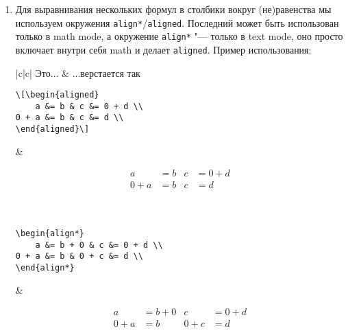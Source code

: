 \begin{enumerate}
\item
	Для выравнивания нескольких формул в столбики вокруг (не)равенства
	мы используем окружения \texttt{align*}/\texttt{aligned}.
	Последний может быть использован только в math mode, а окружение \texttt{align*}
	"--- только в text mode, оно просто включает внутри себя math и делает \texttt{aligned}.
	Пример использования:

	\begin{center}\begin{tabular}{|c|c|}
		\hline Это... & ...верстается так \\
		\hline \begin{minipage}{0.5\linewidth}
\begin{verbatim}
\[\begin{aligned}
    a &= b & c &= 0 + d \\
0 + a &= b & c &= d \\
\end{aligned}\]
\end{verbatim}
		\end{minipage}
        &
		\begin{minipage}{0.35\linewidth}
\[\begin{aligned}
    a &= b & c &= 0 + d \\
0 + a &= b & c &= d \\
\end{aligned}\]\end{minipage} \\
		\hline \begin{minipage}{0.5\linewidth}
\begin{verbatim}
\begin{align*}
    a &= b + 0 & c &= 0 + d \\
0 + a &= b & 0 + c &= d \\
\end{align*}
\end{verbatim}
		\end{minipage}
        &
		\begin{minipage}{0.35\linewidth}
\[\begin{aligned}
    a &= b + 0 & c &= 0 + d \\
0 + a &= b & 0 + c &= d \\
\end{aligned}\]\end{minipage} \\
		\hline
	\end{tabular}\end{center}


\end{enumerate}
